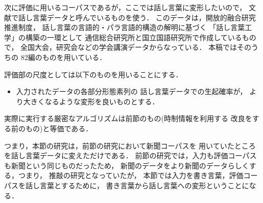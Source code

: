 次に評価に用いるコーパスであるが，ここでは話し言葉に変形したいので，
文献\cite{murata_kaiho_2001}で話し言葉データと呼んでいるものを使う．
このデータは，開放的融合研究推進制度，
話し言葉の言語的・パラ言語的構造の解明に基づく
「話し言葉工学」の構築の一環として
通信総合研究所と国立国語研究所で作成しているもので，
全国大会，研究会などの学会講演データからなっている．
本稿ではそのうちの 82編のものを用いている．

評価部の尺度としては以下のものを用いることにする．
{\begin{itemize}
\item 
  入力されたデータの各部分形態素列の
  話し言葉データでの生起確率が，
  より大きくなるような変形を良いものとする．

\end{itemize}}

実際に実行する厳密なアルゴリズムは前節のもの(時制情報を利用する
改良をする前のもの)と等価である．

つまり，本節の研究は，前節の研究において新聞コーパスを
用いていたところを話し言葉データに変えただけである．
前節の研究では，入力も評価コーパスも新聞という同じものだったため，
新聞のデータをより新聞のデータらしくする，つまり，
推敲の研究となっていたが，
本節では入力を書き言葉，評価コーパスを話し言葉とするために，
書き言葉から話し言葉への変形ということになる．

